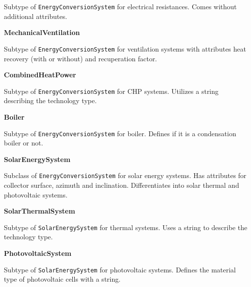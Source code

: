 \documentclass[a4paper,12pt]{article}
\begin{document}
Subtype of \texttt{EnergyConversionSystem} for electrical resistances.
Comes without additional attributes.

\textbf{MechanicalVentilation}

Subtype of \texttt{EnergyConversionSystem} for ventilation systems with
attributes heat recovery (with or without) and recuperation factor.

\textbf{CombinedHeatPower}

Subtype of \texttt{EnergyConversionSystem} for CHP systems. Utilizes a
string describing the technology type.

\textbf{Boiler}

Subtype of \texttt{EnergyConversionSystem} for boiler. Defines if it is
a condensation boiler or not.

\textbf{SolarEnergySystem}

Subclass of \texttt{EnergyConversionSystem} for solar energy systems.
Has attributes for collector surface, azimuth and inclination.
Differentiates into solar thermal and photovoltaic systems.

\textbf{SolarThermalSystem}

Subtype of \texttt{SolarEnergySystem} for thermal systems. Uses a string
to describe the technology type.

\textbf{PhotovoltaicSystem}

Subtype of \texttt{SolarEnergySystem} for photovoltaic systems. Defines
the material type of photovoltaic cells with a string.

\hypertarget{refs}{}
\end{document}
